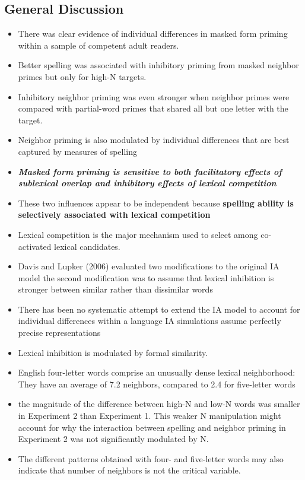 \documentclass[]{article}
\begin{document}
{		\subsection{General Discussion}
		\begin{itemize}
			\item There was clear evidence of individual differences in masked form priming within a sample of competent adult readers.
			\item Better spelling was associated with inhibitory priming from masked neighbor primes but only for high-N targets.
			\item Inhibitory neighbor priming was even stronger when neighbor primes were compared with partial-word primes that shared all but one letter with the target.
			\item Neighbor priming is also modulated by individual differences that are best captured by measures of spelling
			\item \textit{\textbf{Masked form priming is sensitive to both facilitatory effects of sublexical overlap and inhibitory effects of lexical competition}}
			\item These two influences appear to be independent because \textbf{spelling ability is selectively associated with lexical competition}
			\item Lexical competition is the major mechanism used to select among co-activated lexical candidates.
			\item Davis and Lupker (2006) evaluated two modifications to the original IA model \textemdash the second modification was to assume that lexical inhibition is stronger between similar rather than dissimilar words
			\item There has been no systematic attempt to extend the IA model to account for individual differences within a language \textemdash  IA simulations assume perfectly precise representations
			\item Lexical inhibition is modulated by formal similarity.
			\item  English four-letter words comprise an unusually dense lexical neighborhood: They have an average of 7.2 neighbors, compared to 2.4 for five-letter words 
			\item the magnitude of the difference between high-N and low-N words was smaller in Experiment 2 than Experiment 1. This weaker N manipulation might account for why the interaction between spelling and neighbor priming in Experiment 2 was not significantly modulated by N.
			\item The different patterns obtained with four- and five-letter words may also indicate that number of neighbors is not the critical variable. 

\end{itemize}}
\end{document}
